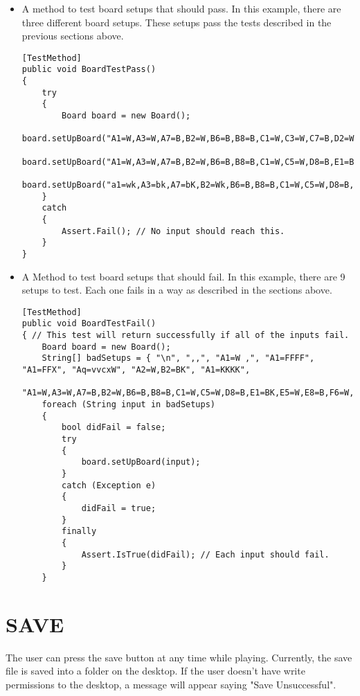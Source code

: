 \documentclass{article}
\begin{document}
\begin{itemize}
\item A method to test board setups that should pass. In this example, there are three different board setups. These setups pass the tests described in the previous sections above. \hfill
\begin{lstlisting}[style=CustomCSharpStyle, firstnumber=10]
[TestMethod]
public void BoardTestPass()
{
    try
    {
        Board board = new Board();
        board.setUpBoard("A1=W,A3=W,A7=B,B2=W,B6=B,B8=B,C1=W,C3=W,C7=B,D2=W,D6=B,D8=B,E1=W,E3=W,E7=B,F2=W,F6=B,F8=B,G1=W,G3=W,G7=B,H2=W,H6=B,H8=B");
        board.setUpBoard("A1=W,A3=W,A7=B,B2=W,B6=B,B8=B,C1=W,C5=W,D8=B,E1=BK,E5=W,E7=B,F6=W,F8=B,G1=W,G7=B,H2=W,H6=B,H8=B");
        board.setUpBoard("a1=wk,A3=bk,A7=bK,B2=Wk,B6=B,B8=B,C1=W,C5=W,D8=B,E1=Bk,e5=W,e7=B,F6=W,F8=B,g1=W,G7=B,H2=W,H6=B,h8=B");
    }
    catch
    {
        Assert.Fail(); // No input should reach this.
    }
}
\end{lstlisting}

\item A Method to test board setups that should fail. In this example, there are 9 setups to test. Each one fails in a way as described in the sections above. \hfill
\begin{lstlisting}[style=CustomCSharpStyle, firstnumber=25]
[TestMethod]
public void BoardTestFail()
{ // This test will return successfully if all of the inputs fail.
    Board board = new Board();
    String[] badSetups = { "\n", ",,", "A1=W ,", "A1=FFFF", "A1=FFX", "Aq=vvcxW", "A2=W,B2=BK", "A1=KKKK",
                         "A1=W,A3=W,A7=B,B2=W,B6=B,B8=B,C1=W,C5=W,D8=B,E1=BK,E5=W,E8=B,F6=W,F8=B,G1=W,G7=B,H2=W,H6=B,H8=B"};
    foreach (String input in badSetups)
    {
        bool didFail = false;
        try
        {
            board.setUpBoard(input);
        }
        catch (Exception e)
        {
            didFail = true;
        }
        finally
        {
            Assert.IsTrue(didFail); // Each input should fail.
        }
    }
\end{lstlisting}
\end{itemize}

\section{SAVE} \label{a2:s:save}
The user can press the save button at any time while playing. Currently, the save file is saved into a folder on the desktop.
If the user doesn't have write permissions to the desktop, a message will appear saying "Save Unsuccessful".
\end{document}
